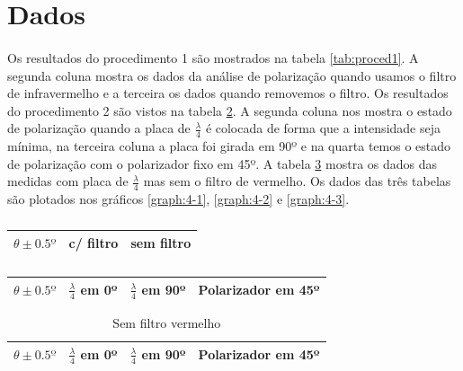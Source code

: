 \documentclass[a4paper,11pt]{article}
\begin{document}
\section{Dados}
\paragraph{} Os resultados do procedimento 1 são mostrados na tabela \ref{tab:proced1}. A segunda coluna mostra os dados da análise de polarização quando usamos o filtro de infravermelho e a terceira os dados quando removemos o filtro. Os resultados do procedimento 2 são vistos na tabela \ref{tab:proced2}. A segunda coluna  nos mostra o estado de polarização quando a placa de $\frac{\lambda}{4}$ é colocada de forma que a intensidade seja mínima, na terceira coluna a placa foi girada em 90º e na quarta temos o estado de polarização com o polarizador fixo em 45º. A tabela \ref{tab:proced3} mostra os dados das medidas com placa de $\frac{\lambda}{4}$ mas sem o filtro de vermelho. Os dados das três tabelas são plotados nos gráficos \ref{graph:4-1}, \ref{graph:4-2} e \ref{graph:4-3}.

\begin{table}[!htp]
	\hspace{-1.5 cm}
	\begin{minipage}{0.4\textwidth}
			\begin{tabular}{|c|c|c|} \hline
				$\theta \pm 0.5º$ & c/ filtro & sem filtro \\ \hline
				
			\end{tabular}
			\caption{Procedimento 1}	
			\label{tab:proced1}
	\end{minipage}
	\hspace{1.5 cm}
	\begin{minipage}{0.4\textwidth}
			\begin{tabular}{|c|c|c|c|}\hline
			$\theta \pm 0.5º$ & $\frac{\lambda}{4}$ em 0º &$\frac{\lambda}{4}$ em 90º & Polarizador em 45º  \\ \hline
			
			\end{tabular}
			\caption{Procedimento 2}
			\label{tab:proced2}
	\end{minipage}
	
	\caption*{}
\end{table}
\FloatBarrier
\begin{table}[!t]
	\vspace{-2.5 cm}
			\centering
			\begin{tabular}{|c|c|c|c|}\hline
			$\theta \pm 0.5º$ & $\frac{\lambda}{4}$ em 0º &$\frac{\lambda}{4}$ em 90º & Polarizador em 45º  \\ \hline
			
			\end{tabular}
			\caption{Sem filtro vermelho}
			\label{tab:proced3}
\end{table}
\FloatBarrier
\end{document}
